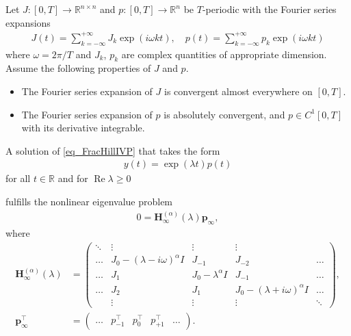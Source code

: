 \documentclass{svproc}
\newcommand{\realnumbers}{\mathbb{R}}
\newcommand{\BoldAndUnderlineRed}[1]{{\color{BrickRed}\underline{\smash{\textbf{#1}}}}}
\newcommand{\pVec}{\mathbf p}
\newcommand{\hMat}{\mathbf H}
\newcommand{\assp}{(A2)}
\newcommand{\assJ}{(A1)}
\begin{document}
{%
	{%
		\begin{theorem}\label{thm_fracHill}
			{ Let $J:[0,T]\to \realnumbers^{n\times n}$ and $p:[0,T]\to \realnumbers^n$ be $T$-periodic with the Fourier series expansions
				\begin{align}\label{eq_FracHillFourierForm}
					J(t) = \sum_{k=-\infty}^{+\infty}J_k\exp(i\omega k t),\quad p(t) = \sum_{k=-\infty}^{+\infty}p_k\exp(i\omega k t)
				\end{align}
				where $\omega = 2\pi / T$ and $J_k$, $p_k$ are complex quantities of appropriate dimension. Assume the following properties of $J$ and $p$.
				\begin{itemize}
					\item[\assJ] The Fourier series expansion of $J$ is convergent almost everywhere on $[0,T]$. 
					\item[\assp] The Fourier series expansion of $p$ is absolutely convergent, and $p \in C^1[0,T]$ with its derivative integrable.
				\end{itemize} A solution of \eqref{eq_FracHillIVP} that takes the form
				\begin{align}\label{eq_solutionFloquetForm}
					y(t) = \exp(\lambda t)p(t)
				\end{align}
				for all $t\in \realnumbers$ and for $\operatorname{Re}\lambda\geq 0$} fulfills the nonlinear eigenvalue problem
			\begin{align}\label{eq_fracHilleqn}
				0 = \hMat_\infty^{(\alpha)} (\lambda)\pVec_\infty,
			\end{align}
			where
			\begin{align}\label{eq_fracHillmat}
				\hMat_\infty^{(\alpha)}(\lambda) &= \begin{pmatrix}
					\ddots & \vdots & \vdots & \vdots & \\
					\dots & J_0 - (\lambda -i\omega)^\alpha I & J_{-1} & J_{-2} & \dots\\
					\dots & J_1 & J_0 -\lambda^\alpha I & J_{-1} & \dots\\
					\dots & J_{2} & J_{1} & J_0 - (\lambda +i\omega)^\alpha I & \dots\\
					& \vdots & \vdots & \vdots & \ddots
				\end{pmatrix},
				\\
				\pVec_\infty^\top &= \begin{pmatrix}
					\dots &	p_{-1}^\top & p_0^\top &	p_{+1}^\top &\dots
				\end{pmatrix}.

\end{align}
\end{theorem}}}
\end{document}
